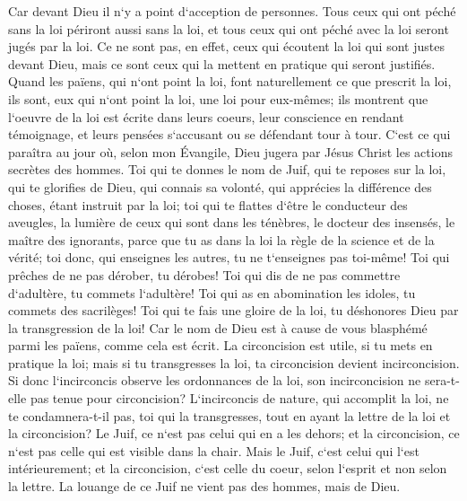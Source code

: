\verse Car devant Dieu il n`y a point d`acception de personnes. 
\verse Tous ceux qui ont péché sans la loi périront aussi sans la loi, et tous ceux qui ont péché avec la loi seront jugés par la loi. 
\verse Ce ne sont pas, en effet, ceux qui écoutent la loi qui sont justes devant Dieu, mais ce sont ceux qui la mettent en pratique qui seront justifiés. 
\verse Quand les païens, qui n`ont point la loi, font naturellement ce que prescrit la loi, ils sont, eux qui n`ont point la loi, une loi pour eux-mêmes; 
\verse ils montrent que l`oeuvre de la loi est écrite dans leurs coeurs, leur conscience en rendant témoignage, et leurs pensées s`accusant ou se défendant tour à tour. 
\verse C`est ce qui paraîtra au jour où, selon mon Évangile, Dieu jugera par Jésus Christ les actions secrètes des hommes. 
\verse Toi qui te donnes le nom de Juif, qui te reposes sur la loi, qui te glorifies de Dieu, 
\verse qui connais sa volonté, qui apprécies la différence des choses, étant instruit par la loi; 
\verse toi qui te flattes d`être le conducteur des aveugles, la lumière de ceux qui sont dans les ténèbres, 
\verse le docteur des insensés, le maître des ignorants, parce que tu as dans la loi la règle de la science et de la vérité; 
\verse toi donc, qui enseignes les autres, tu ne t`enseignes pas toi-même! Toi qui prêches de ne pas dérober, tu dérobes! 
\verse Toi qui dis de ne pas commettre d`adultère, tu commets l`adultère! Toi qui as en abomination les idoles, tu commets des sacrilèges! 
\verse Toi qui te fais une gloire de la loi, tu déshonores Dieu par la transgression de la loi! 
\verse Car le nom de Dieu est à cause de vous blasphémé parmi les païens, comme cela est écrit. 
\verse La circoncision est utile, si tu mets en pratique la loi; mais si tu transgresses la loi, ta circoncision devient incirconcision. 
\verse Si donc l`incirconcis observe les ordonnances de la loi, son incirconcision ne sera-t-elle pas tenue pour circoncision? 
\verse L`incirconcis de nature, qui accomplit la loi, ne te condamnera-t-il pas, toi qui la transgresses, tout en ayant la lettre de la loi et la circoncision? 
\verse Le Juif, ce n`est pas celui qui en a les dehors; et la circoncision, ce n`est pas celle qui est visible dans la chair. 
\verse Mais le Juif, c`est celui qui l`est intérieurement; et la circoncision, c`est celle du coeur, selon l`esprit et non selon la lettre. La louange de ce Juif ne vient pas des hommes, mais de Dieu. 

